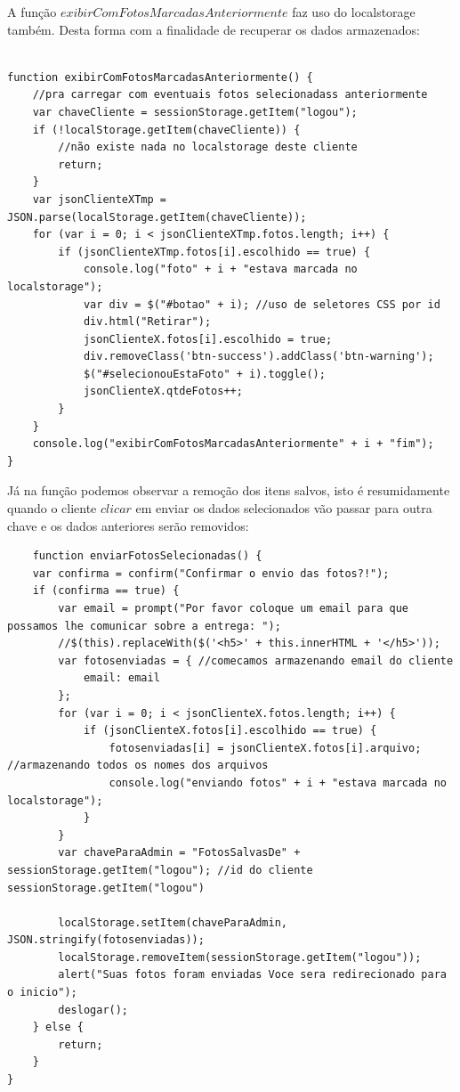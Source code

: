 	A função $exibirComFotosMarcadasAnteriormente$ faz uso do localstorage também. Desta forma com a finalidade de recuperar os dados armazenados:
\begin{lstlisting}	
	
function exibirComFotosMarcadasAnteriormente() {
    //pra carregar com eventuais fotos selecionadass anteriormente
    var chaveCliente = sessionStorage.getItem("logou");
    if (!localStorage.getItem(chaveCliente)) {
        //não existe nada no localstorage deste cliente
        return;
    }
    var jsonClienteXTmp = JSON.parse(localStorage.getItem(chaveCliente));
    for (var i = 0; i < jsonClienteXTmp.fotos.length; i++) {
        if (jsonClienteXTmp.fotos[i].escolhido == true) {
            console.log("foto" + i + "estava marcada no localstorage");
            var div = $("#botao" + i); //uso de seletores CSS por id
            div.html("Retirar");
            jsonClienteX.fotos[i].escolhido = true;
            div.removeClass('btn-success').addClass('btn-warning');
            $("#selecionouEstaFoto" + i).toggle();
            jsonClienteX.qtdeFotos++;
        }
    }
    console.log("exibirComFotosMarcadasAnteriormente" + i + "fim");
}

	\end{lstlisting}
	
	Já na função podemos observar a remoção dos itens salvos, isto é resumidamente quando o cliente $clicar$ em enviar os dados selecionados vão passar para outra chave e os dados anteriores serão removidos:
	\begin{lstlisting}	
	function enviarFotosSelecionadas() {
    var confirma = confirm("Confirmar o envio das fotos?!");
    if (confirma == true) {
        var email = prompt("Por favor coloque um email para que possamos lhe comunicar sobre a entrega: ");
        //$(this).replaceWith($('<h5>' + this.innerHTML + '</h5>'));
        var fotosenviadas = { //comecamos armazenando email do cliente
            email: email
        };
        for (var i = 0; i < jsonClienteX.fotos.length; i++) {
            if (jsonClienteX.fotos[i].escolhido == true) {
                fotosenviadas[i] = jsonClienteX.fotos[i].arquivo; //armazenando todos os nomes dos arquivos
                console.log("enviando fotos" + i + "estava marcada no localstorage");
            }
        }
        var chaveParaAdmin = "FotosSalvasDe" + sessionStorage.getItem("logou"); //id do cliente sessionStorage.getItem("logou")
        
        localStorage.setItem(chaveParaAdmin, JSON.stringify(fotosenviadas));
        localStorage.removeItem(sessionStorage.getItem("logou"));
        alert("Suas fotos foram enviadas Voce sera redirecionado para o inicio");
        deslogar();
    } else {
        return;
    }
}	
		\end{lstlisting}
